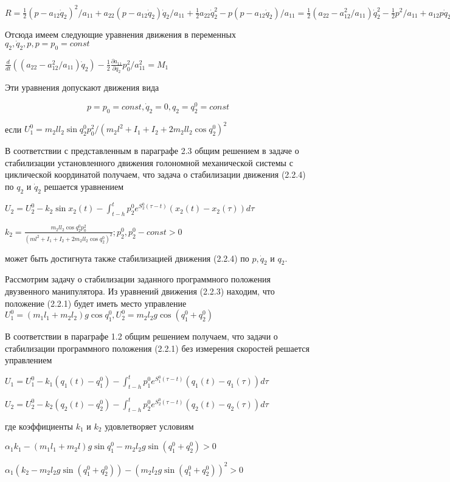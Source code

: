$R = \frac12 (p - a_{12} \dot q_2)^2 / a_{11} + a_{22} (p - a_{12} \dot q_2) \dot q_2 / a_{11} + \frac12 a_{22} \dot q_2^2 - p (p - a_{12} \dot q_2) / a_{11} = \frac12 (a_22 - a_{12}^2 / a_{11}) \dot q_2^2 - \frac12 p^2 / a_{11} + a_{12} p \dot q_2 / a_{11}$
		
Отсюда имеем следующие уравнения движения в переменных $q_2, \dot q_2, p, p = p_0 = const$
		
$\frac{d}{dt} ((a_{22} - a_{12}^2 / a_{11}) \dot q_2) - \frac12 \frac{\partial a_{11}}{\partial q_2} p_0^2 / a_{11}^2 = M_1$


Эти уравнения допускают движения вида 

\begin{equation}
p = p_0 = const, \dot q_2 = 0, q_2 = q_2^0 = const
\end{equation}

если $U_1^0 = m_2 l l_2 \sin q_2^0 p_0^2 / (m_2 l^2 + I_1 + I_2 + 2 m_2 l l_2 \cos q_2^0)^2$
		
В соответствии с представленным в параграфе 2.3 общим решением в задаче о стабилизации установленного движения голономной механической системы с циклической координатой получаем, что задача о стабилизации движения (2.2.4) по $q_2$ и $\dot q_2$ решается уравнением 
		
$U_2 = U_2^0 - k_2 \sin x_2 (t) - \int_{t-h}^{t} p_2^0 e^{S_2^0 (\tau - t)} (x_2 (t) - x_2 (\tau)) d \tau$
		
$k_2 = \frac{m_2 l l_2 \cos q_2^0 p_0^2}{(m l^2 + I_1 + I_2 + 2 m_2 l l_2 \cos q_2^0)^2}; p_2^0,  p_2^0 - const > 0$
		
может быть достигнута также стабилизацией движения (2.2.4) по $p, \dot q_2$ и $q_2.$
		
Рассмотрим задачу о стабилизации заданного программного положения двузвенного манипулятора. Из уравнений движения (2.2.3) находим, что положение (2.2.1) будет иметь место управление $U_1^0 = (m_1 l_1 + m_2 l_2) g \cos q_1^0, U_2^0 = m_2 l_2 g \cos (q_1^0 + q_2^0)$
		
В соответствии в параграфе 1.2 общим решением получаем, что задачи о стабилизации программного положения (2.2.1) без измерения скоростей решается управлением 
		
$U_1 = U_1^0 - k_1 (q_1(t) - q_1^0) - \int_{t-h}^{t} p_1^0 e^{S_1^0 (\tau - t)} (q_1(t) - q_1(\tau)) d \tau$
		
$U_2 = U_2^0 - k_2 (q_2(t) - q_2^0) - \int_{t-h}^{t} p_2^0 e^{S_2^0 (\tau - t)} (q_2(t) - q_2(\tau)) d \tau$
		
где коэффициенты $k_1$ и $k_2$ удовлетворяет условиям 
		
$\alpha_1 k_1 - (m_1 l_1 + m_2 l) g \sin q_1^0 - m_2 l_2 g \sin (q_1^0 + q_2^0) > 0$
		
$\alpha_1 (k_2 - m_2 l_2 g \sin (q_1^0 + q_2^0)) - (m_2 l_2 g \sin (q_1^0 + q_2^0))^2 > 0$